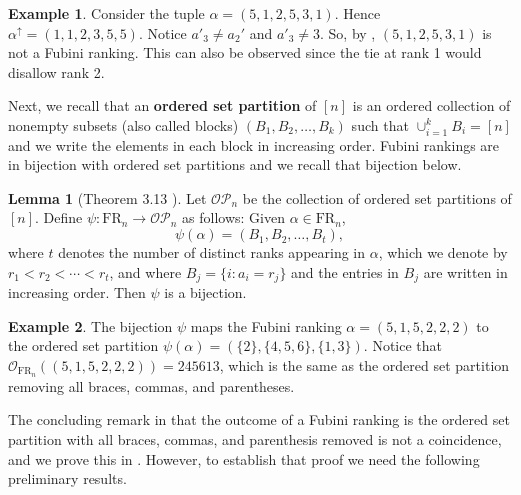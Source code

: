 \documentclass{amsart}
\newcommand{\defterm}{\textbf}
\theoremstyle{definition}
\newtheorem{example}{Example}[section]
\newtheorem{lemma}{Lemma}[section]
\theoremstyle{definition}
\theoremstyle{remark}
\newcommand{\FR}[1]{\mathrm{FR}_{#1}}
\newcommand{\out}{\mathcal{O}}
\begin{document}
\begin{example}
    Consider the tuple $\alpha=(5,1,2,5,3,1)$. Hence $\alpha^\uparrow=(1,1,2,3,5,5)$. Notice 
     $a'_{3}\neq a_2'$ and $a'_{3}\neq3$. So, by , $(5,1,2,5,3,1)$ is not a Fubini ranking. This can also be observed since the tie at rank 1 would disallow rank 2.
\end{example}

Next, we recall that an \defterm{ordered set partition} of $[n]$ is an ordered collection of nonempty subsets (also called blocks) $(B_1,B_2,\ldots,B_k)$ such that $\cup_{i=1}^kB_i=[n]$ and we write the elements in each block in increasing order.
Fubini rankings are in bijection with ordered set partitions and we recall that bijection below.
\begin{lemma}[Theorem 3.13 \cite{barreto2025restrictedfubinirankingsrestricted}]\label{lem:bijection between Fubini rankings and ordered set partitions}
Let $\mathcal{OP}_n$ be the collection of ordered set partitions of $[n]$. 
Define $\psi:\FR{n}\to \mathcal{OP}_n$ as follows: Given $\alpha \in \FR{n}$,
\[\psi(\alpha)=(B_1,B_2,\ldots,B_t),\]
where $t$ denotes the number of distinct ranks appearing in $\alpha$, which we denote by $r_1<r_2<\cdots<r_t$, and where $B_j=\{i:a_i=r_j\}$ and the entries in $B_j$ are written in increasing order. Then $\psi$ is a bijection.
\end{lemma}

\begin{example}\label{Surprise!}
The bijection $\psi$ maps the Fubini ranking $\alpha=(5,1,5,2,2,2)$ to  the ordered set partition $\psi(\alpha)=(\{2\},\{4,5,6\},\{1,3\})$. 
Notice that $\out_{\FR{n}}((5,1,5,2,2,2))=245613$, which is the same as the ordered set partition removing all braces, commas, and parentheses. 
\end{example} 

The concluding remark in  that the outcome of a Fubini ranking is the ordered set partition with all braces, commas, and parenthesis removed is not a coincidence, and we prove this in . However, to establish that proof  we need the following preliminary results.
\end{document}
